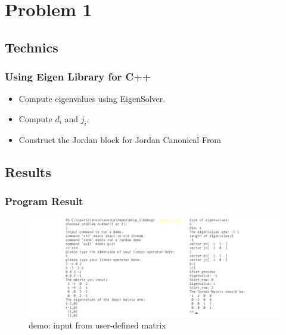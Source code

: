 \section{Problem 1}
\subsection{Technics}

    \begin{frame}
        \frametitle{Using Eigen Library for C++}

        \begin{itemize}
            \item Compute eigenvalues using EigenSolver.
            \item Compute \(d_i\) and \(j_i\).
            \item Construct the Jordan block for Jordan Canonical From
        \end{itemize}

    \end{frame}

    \subsection{Results}
    \begin{frame}
        \frametitle{Program Result}
        
        \begin{figure}
            \centering
            \includegraphics[height = 0.65\textheight]{img/result1.png}
            \caption{demo: input from user-defined matrix}
        \end{figure}
        
    \end{frame}
